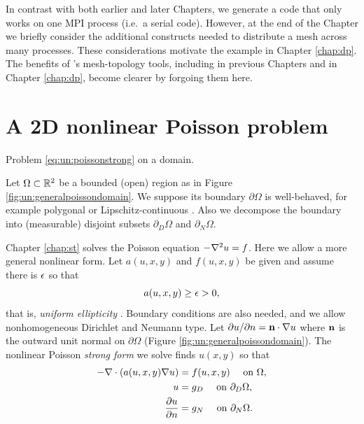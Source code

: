 In contrast with both earlier and later Chapters, we generate a code that only works on one MPI process (i.e.~a serial code).  However, at the end of the Chapter we briefly consider the additional constructs needed to distribute a mesh across many processes.  These considerations motivate the \pDMPlex example in Chapter \ref{chap:dp}.  The benefits of \PETSc's mesh-topology \pDM tools, including \pDMDA in previous Chapters and \pDMPlex in Chapter \ref{chap:dp}, become clearer by forgoing them here.


\section{A 2D nonlinear Poisson problem}

\begin{marginfigure}

\caption{Problem \eqref{eq:un:poissonstrong} on a domain.}
\label{fig:un:generalpoissondomain}
\end{marginfigure}

Let $\Omega \subset \mathbb{R}^2$ be a bounded (open) region as in Figure \ref{fig:un:generalpoissondomain}.  We suppose its boundary $\partial\Omega$ is well-behaved, for example polygonal or Lipschitz-continuous \citep[section 1.2]{Ciarlet2002}.  Also we decompose the boundary into (measurable) disjoint subsets $\partial_D \Omega$ and $\partial_N \Omega$.

Chapter \ref{chap:st} solves the Poisson equation $- \nabla^2 u = f$.  Here we allow a more general nonlinear form.  Let $a(u,x,y)$ and $f(u,x,y)$ be given and assume there is $\epsilon$ so that
\begin{equation}
a(u,x,y) \ge \epsilon > 0, \label{eq:un:uniformelliptic}
\end{equation}
that is, \emph{uniform ellipticity} \citep{Evans2010}.  Boundary conditions are also needed, and we allow nonhomogeneous Dirichlet and Neumann type.  Let $\partial u/\partial n = \mathbf{n} \cdot \nabla u$ where $\mathbf{n}$ is the outward unit normal on $\partial \Omega$ (Figure \ref{fig:un:generalpoissondomain}).  The nonlinear Poisson \emph{strong form} we solve finds $u(x,y)$ so that
\begin{align}
- \nabla\cdot \left(a(u,x,y) \nabla u\right) &= f(u,x,y) \quad \text{ on } \Omega, \label{eq:un:poissonstrong} \\
u &= g_D \quad \text{ on } \partial_D \Omega, \notag \\
\frac{\partial u}{\partial n} &= g_N \quad \text{ on } \partial_N \Omega. \notag
\end{align}

